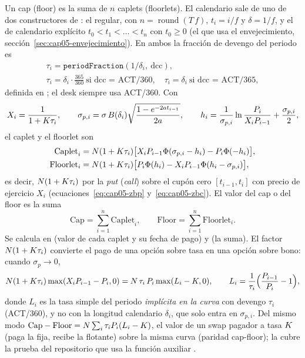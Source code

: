 Un cap (floor) es la suma de $n$ caplets (floorlets). El calendario sale de uno de dos constructores de
: el regular, con $n=\operatorname{round}(T\,f)$,
$t_i=i/f$ y $\delta=1/f$, y el de calendario explícito $t_0<t_1<\dots<t_n$ con $t_0\ge0$ (el que usa el
envejecimiento, sección~\ref{sec:cap05-envejecimiento}). En ambos la fracción de devengo del periodo es
\[
\begin{gathered}
  \tau_i = \texttt{periodFraction}(1/\delta_i,\ \mathrm{dcc}), \\
  \tau_i = \delta_i\cdot\tfrac{365}{360}\ \text{si dcc = ACT/360},\quad
  \tau_i=\delta_i\ \text{si dcc = ACT/365},
\end{gathered}
\]
definida en ; el desk siempre usa ACT/360. Con
\begin{equation}\label{eq:cap05-caplet-parametros}
  X_i = \frac{1}{1+K\tau_i},\qquad
  \sigma_{p,i} = \sigma\,B(\delta_i)\sqrt{\frac{1-e^{-2a t_{i-1}}}{2a}},\qquad
  h_i = \frac{1}{\sigma_{p,i}}\ln\frac{P_i}{X_iP_{i-1}} + \frac{\sigma_{p,i}}{2},
\end{equation}
el caplet y el floorlet son
\begin{align}
  \mathrm{Caplet}_i &= N(1+K\tau_i)\bigl[X_iP_{i-1}\Phi(\sigma_{p,i}-h_i) - P_i\Phi(-h_i)\bigr], \label{eq:cap05-caplet}\\
  \mathrm{Floorlet}_i &= N(1+K\tau_i)\bigl[P_i\Phi(h_i) - X_iP_{i-1}\Phi(h_i-\sigma_{p,i})\bigr], \label{eq:cap05-floorlet}
\end{align}
es decir, $N(1+K\tau_i)$ por la \emph{put} (\emph{call}) sobre el cupón cero $[t_{i-1},t_i]$ con precio de
ejercicio $X_i$ (ecuaciones~\eqref{eq:cap05-zbp} y~\eqref{eq:cap05-zbc}). El valor del cap o del floor es la
suma
\begin{equation}\label{eq:cap05-cap}
  \mathrm{Cap}=\sum_{i=1}^{n}\mathrm{Caplet}_i,\qquad \mathrm{Floor}=\sum_{i=1}^{n}\mathrm{Floorlet}_i.
\end{equation}
Se calcula en  (valor de cada caplet y su fecha de
pago) y  (la suma). El factor $N(1+K\tau_i)$
convierte el pago de una opción sobre tasa en una opción sobre bono: cuando $\sigma_p\to0$,
\[
  N(1+K\tau_i)\max(X_iP_{i-1}-P_i,0) = N\,\tau_i\,P_i\max(L_i-K,0),\qquad
  L_i = \frac{1}{\tau_i}\Bigl(\frac{P_{i-1}}{P_i}-1\Bigr),
\]
donde $L_i$ es la tasa simple del periodo \emph{implícita en la curva} con devengo $\tau_i$ (ACT/360), y no
con la longitud calendario $\delta_i$, que solo entra en $\sigma_{p,i}$. Del mismo modo
$\mathrm{Cap}-\mathrm{Floor}=N\sum_i\tau_iP_i(L_i-K)$, el valor de un swap pagador a tasa $K$ (paga la fija, recibe la
flotante) sobre la misma curva (paridad cap-floor); la cubre la prueba del repositorio que usa
la función auxiliar .

